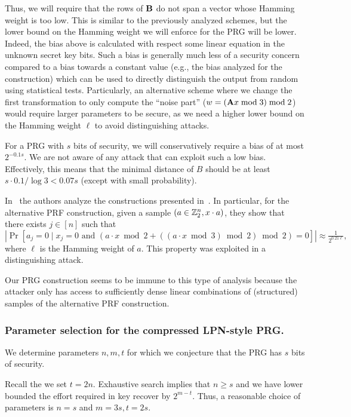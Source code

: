 Thus, we will require
that the rows of $\mat{B}$ do not span a vector whose Hamming weight is too low.
This is similar to the previously analyzed schemes,
but the lower bound on the Hamming weight we will enforce for the PRG will be lower.
Indeed, the bias above is calculated with respect some linear equation in the unknown secret key bits.
Such a bias is generally much less of a security concern compared to a bias towards a constant value
(e.g., the bias analyzed for the \ttwPRF construction) which can be used
to directly distinguish the output from random using statistical tests.
Particularly, an alternative scheme where we change the first transformation
to only compute the ``noise part''
($w =(\mat{A}x \bmod 3) \bmod 2$) would require larger parameters to be secure,
as we need a higher lower bound on the Hamming weight $\ell$ to avoid distinguishing attacks.

For a PRG with $s$ bits of security, we will conservatively require a bias of at most $2^{-0.1 s}$.
We are not aware of any attack that can exploit such a low bias.
Effectively, this means that the minimal distance of $B$ should be
at least $s \cdot 0.1/\log 3 < 0.07 s$ (except with small probability).


\begin{remark}
In~\cite{CheonCKK20} the authors analyze the constructions presented in~\cite{boneh2018-darkmatter}.
In particular, for the alternative PRF construction,
given a sample $(a \in \mathbb{Z}_2^n, x \cdot a)$,
they show that there exists $j \in [n]$ such that
$$|\Pr[a_j = 0 \mid x_j = 0 \text{ and } (a \cdot x \bmod 2 + ((a \cdot x \bmod 3) \bmod 2) \bmod 2) = 0]| \approx \tfrac{1}{2^{0.21 \ell}},$$
where $\ell$ is the Hamming weight of $a$.
This property was exploited in a distinguishing attack.

Our PRG construction seems to be immune to this type of analysis
because the attacker only has access to sufficiently dense linear combinations of (structured) samples
of the alternative PRF construction.
\end{remark}


\subsubsection{Parameter selection for the compressed LPN-style PRG.}

We determine parameters $n,m,t$ for which
we conjecture that the
PRG has $s$ bits of security.

Recall the we set $t = 2n$.
Exhaustive search implies that $n \geq s$ and we have lower
bounded the effort required in key recover by $2^{m - t}$.
Thus, a reasonable choice of parameters is $n = s$ and $m = 3s, t = 2s$.

